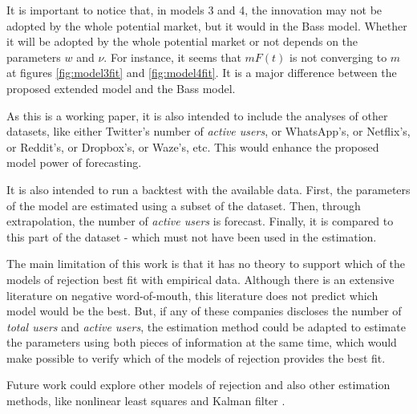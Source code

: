 It is important to notice that, in models 3 and 4, the innovation may not be adopted by the whole potential market, but it would in the Bass model. Whether it will be adopted by the whole potential market or not depends on the parameters $w$ and $\nu$. For instance, it seems that $mF(t)$ is not converging to $m$ at figures \ref{fig:model3fit} and \ref{fig:model4fit}. It is a major difference between the proposed extended model and the Bass model.

As this is a working paper, it is also intended to include the analyses of other datasets, like either Twitter's number of \textit{active users}, or WhatsApp's, or Netflix's, or Reddit's, or Dropbox's, or Waze's, etc. This would enhance the proposed model power of forecasting.

It is also intended to run a backtest with the available data. First, the parameters of the model are estimated using a subset of the dataset. Then, through extrapolation, the number of \textit{active users} is forecast. Finally, it is compared to this part of the dataset - which must not have been used in the estimation.

The main limitation of this work is that it has no theory to support which of the models of rejection best fit with empirical data. Although there is an extensive literature on negative word-of-mouth, this literature does not predict which model would be the best. But, if any of these companies discloses the number of \textit{total users} and \textit{active users}, the estimation method could be adapted to estimate the parameters using both pieces of information at the same time, which would make possible to verify which of the models of rejection provides the best fit.

Future work could explore other models of rejection and also other estimation methods, like nonlinear least squares \citep{srinivasan1986technical} and Kalman filter \citep{xie1997kalman}.
